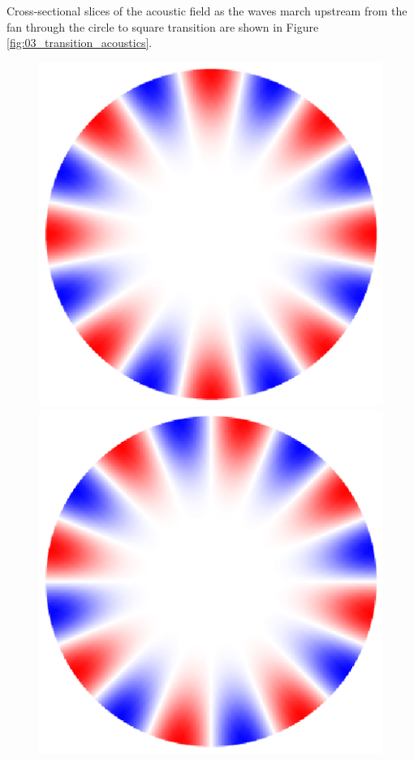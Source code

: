 Cross-sectional slices of the acoustic field as the waves march upstream from the fan through the circle to square transition are shown in Figure \ref{fig:03_transition_acoustics}.
\begin{figure}
  \centering
  \includegraphics[trim={0.3in 0.3in 0.3in 0.3in},clip]{../matlab/03_aero_optics_acoustics/tunnel_slices/tunnel_acoustic_against_0.6_8_0_0_001.eps}
  \includegraphics[trim={0.3in 0.3in 0.3in 0.3in},clip]{../matlab/03_aero_optics_acoustics/tunnel_slices/tunnel_acoustic_against_0.6_8_0_1.5708_001.eps} \\

\end{figure}
